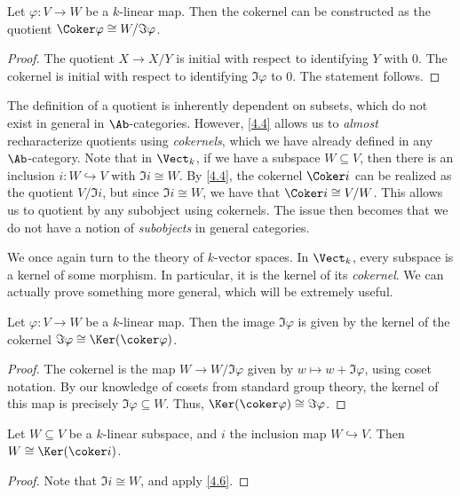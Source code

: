 \begin{proposition}\label{4.4}
	Let $\varphi : V \to W$ be a $k$-linear map. Then the cokernel can be constructed as the quotient $\Coker \varphi \cong W / \Im \varphi $.
\end{proposition}
\begin{proof}
	The quotient $X\to X/Y$ is initial with respect to identifying $Y$ with $0$. The cokernel is initial with respect to identifying $\Im \varphi $ to 0. The statement follows.
\end{proof}

\begin{remark}\label{4.5}
	The definition of a quotient is inherently dependent on subsets, which do not exist in general in $\Ab $-categories. However, \cref{4.4} allows us to \emph{almost} recharacterize quotients using \emph{cokernels}, which we have already defined in any $\Ab $-category. Note that in $\Vect_{k} $, if we have a subspace $W\subseteq V$, then there is an inclusion $i : W \hookrightarrow V$ with $\Im i \cong W$. By \cref{4.4}, the cokernel $\Coker i$ can be realized as the quotient $V / \Im i$, but since $\Im i \cong W$, we have that $\Coker i \cong V / W$. This allows us to quotient by any subobject using cokernels. The issue then becomes that we do not have a notion of \emph{subobjects} in general categories.
\end{remark}

We once again turn to the theory of $k$-vector spaces. In $\Vect_k$, every subspace is a kernel of some morphism. In particular, it is the kernel of its \emph{cokernel}. We can actually prove something more general, which will be extremely useful.

\begin{proposition}\label{4.6}
	Let $\varphi : V \to W$ be a $k$-linear map. Then the image $\Im \varphi $ is given by the kernel of the cokernel $\Im \varphi \cong \Ker (\coker \varphi )$.
\end{proposition}
\begin{proof}
	The cokernel is the map $W\to W/\Im \varphi $ given by $w\mapsto w+\Im \varphi $, using coset notation. By our knowledge of cosets from standard group theory, the kernel of this map is precisely $\Im \varphi \subseteq W$. Thus, $\Ker (\coker \varphi )\cong \Im \varphi $.
\end{proof}
\begin{corollary}\label{4.7}
	Let $W\subseteq V$ be a $k$-linear subspace, and $i$ the inclusion map $W\hookrightarrow V$. Then $W \cong \Ker (\coker i)$.
\end{corollary}
\begin{proof}
	Note that $\Im i \cong W$, and apply \cref{4.6}.
\end{proof}

